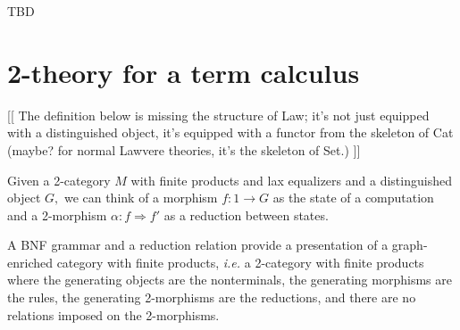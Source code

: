 \documentclass[]{acm_proc_article-sp}
\numberwithin{equation}{subsection}
\begin{document}
TBD

\section{2-theory for a term calculus}

\begin{comment}
  * 2-categories with finite products as presentations of configurations

      * problem with 2-morphisms as rewrites

          * normal order evaluation

          * pi calculus

      * reduction contexts as morphisms

          * linear use of reduction contexts in rewrites = number of processors

          * if reduction contexts are consumed, get a notion similar to Ethereum's gas

      * models in Cat

          * monad T

          * free model in Cat on empty category gives a quiver of terms & rewrites
\end{comment}



[[ The definition below is missing the structure of Law; it's not just equipped with a distinguished object, it's equipped with a functor from the skeleton of Cat (maybe? for normal Lawvere theories, it's the skeleton of Set.) ]]

Given a 2-category $M$ with finite products and lax equalizers and a distinguished object $G,$ we can think of a morphism ${f\colon 1 \to G}$ as the state of a computation and a 2-morphism ${\alpha\colon f \Rightarrow f'}$ as a reduction between states.

A BNF grammar and a reduction relation provide a presentation of a graph-enriched category with finite products, {\em i.e.} a 2-category with finite products where the generating objects are the nonterminals, the generating morphisms are the rules, the generating 2-morphisms are the reductions, and there are no relations imposed on the 2-morphisms.
\end{document}
